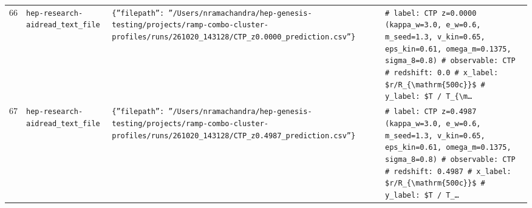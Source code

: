 \documentclass[11pt,a4paper]{article}
\begin{document}
\begin{longtable}{@{}p{}p{}p{}p{}@{}}
66 & \texttt{hep-research-aid}\newline\texttt{read\_\allowbreak{}text\_\allowbreak{}file} & \texttt{\{''filepath'':\allowbreak{} ''/\allowbreak{}Users/\allowbreak{}nramachandra/\allowbreak{}hep-genesis-testing/\allowbreak{}projects/\allowbreak{}ramp-combo-cluster-profiles/\allowbreak{}runs/\allowbreak{}261020\_\allowbreak{}143128/\allowbreak{}CTP\_\allowbreak{}z0.0000\_\allowbreak{}prediction.csv''\}\allowbreak{}} & \texttt{\# label:\allowbreak{} CTP z=\allowbreak{}0.0000 (kappa\_\allowbreak{}w=\allowbreak{}3.0,\allowbreak{} e\_\allowbreak{}w=\allowbreak{}0.6,\allowbreak{} m\_\allowbreak{}seed=\allowbreak{}1.3,\allowbreak{} v\_\allowbreak{}kin=\allowbreak{}0.65,\allowbreak{} eps\_\allowbreak{}kin=\allowbreak{}0.61,\allowbreak{} omega\_\allowbreak{}m=\allowbreak{}0.1375,\allowbreak{} sigma\_\allowbreak{}8=\allowbreak{}0.8)\allowbreak{} \# observable:\allowbreak{} CTP \# redshift:\allowbreak{} 0.0 \# x\_\allowbreak{}label:\allowbreak{} \$r/\allowbreak{}R\_\allowbreak{}\{\textbackslash{}\allowbreak{}mathrm\{500c\}\allowbreak{}\}\allowbreak{}\$ \# y\_\allowbreak{}label:\allowbreak{} \$T /\allowbreak{} T\_\allowbreak{}\{\textbackslash{}\allowbreak{}m\ldots{}\allowbreak{}} \\
67 & \texttt{hep-research-aid}\newline\texttt{read\_\allowbreak{}text\_\allowbreak{}file} & \texttt{\{''filepath'':\allowbreak{} ''/\allowbreak{}Users/\allowbreak{}nramachandra/\allowbreak{}hep-genesis-testing/\allowbreak{}projects/\allowbreak{}ramp-combo-cluster-profiles/\allowbreak{}runs/\allowbreak{}261020\_\allowbreak{}143128/\allowbreak{}CTP\_\allowbreak{}z0.4987\_\allowbreak{}prediction.csv''\}\allowbreak{}} & \texttt{\# label:\allowbreak{} CTP z=\allowbreak{}0.4987 (kappa\_\allowbreak{}w=\allowbreak{}3.0,\allowbreak{} e\_\allowbreak{}w=\allowbreak{}0.6,\allowbreak{} m\_\allowbreak{}seed=\allowbreak{}1.3,\allowbreak{} v\_\allowbreak{}kin=\allowbreak{}0.65,\allowbreak{} eps\_\allowbreak{}kin=\allowbreak{}0.61,\allowbreak{} omega\_\allowbreak{}m=\allowbreak{}0.1375,\allowbreak{} sigma\_\allowbreak{}8=\allowbreak{}0.8)\allowbreak{} \# observable:\allowbreak{} CTP \# redshift:\allowbreak{} 0.4987 \# x\_\allowbreak{}label:\allowbreak{} \$r/\allowbreak{}R\_\allowbreak{}\{\textbackslash{}\allowbreak{}mathrm\{500c\}\allowbreak{}\}\allowbreak{}\$ \# y\_\allowbreak{}label:\allowbreak{} \$T /\allowbreak{} T\_\allowbreak{}\ldots{}\allowbreak{}} \\

\end{longtable}
\end{document}
